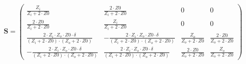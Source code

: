 \begin{equation} \mathbf{S} = \left(\begin{array}{cccc}
\frac{Z_i}{Z_i+2\cdot Z0} & \frac{2\cdot Z0}{Z_i+2\cdot Z0} & 0 & 0 \\
\frac{2\cdot Z0}{Z_i+2\cdot Z0} & \frac{Z_i}{Z_i+2\cdot Z0} & 0 & 0 \\
\frac{2\cdot Z_i\cdot Z_o\cdot Z0\cdot \delta}{\left(Z_i+2\cdot
Z0\right)\cdot\left(Z_o+2\cdot Z0\right)} & -\frac{2\cdot Z_i\cdot
Z_o\cdot Z0\cdot \delta}{\left(Z_i+2\cdot
Z0\right)\cdot\left(Z_o+2\cdot Z0\right)} & \frac{Z_o}{Z_o+2\cdot Z0}
& \frac{2\cdot Z0}{Z_o+2\cdot Z0} \\ -\frac{2\cdot Z_i\cdot Z_o\cdot
Z0\cdot \delta}{\left(Z_i+2\cdot Z0\right)\cdot\left(Z_o+2\cdot
Z0\right)} & \frac{2\cdot Z_i\cdot Z_o\cdot Z0\cdot
\delta}{\left(Z_i+2\cdot Z0\right)\cdot\left(Z_o+2\cdot Z0\right)} &
\frac{2\cdot Z0}{Z_o+2\cdot Z0} & \frac{Z_o}{Z_o+2\cdot Z0}
\end{array}\right) \end{equation}
